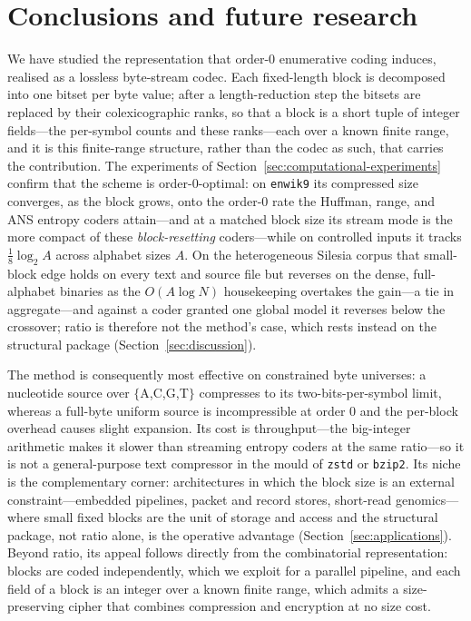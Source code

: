 \documentclass[entropy,article,submit,oneauthor,pdftex]{Definitions/mdpi}
\begin{document}
\section{Conclusions and future research}\label{sec:conclusions}
We have studied the representation that order-$0$ enumerative coding induces, realised as a
lossless byte-stream codec. Each fixed-length block is decomposed into one bitset per byte
value; after a length-reduction step the bitsets are replaced by their colexicographic
ranks, so that a block is a short tuple of integer fields---the per-symbol counts and these
ranks---each over a known finite range, and it is this finite-range structure, rather than
the codec as such, that carries the contribution. The experiments of
Section~\ref{sec:computational-experiments} confirm that the scheme is
order-$0$-optimal: on \texttt{enwik9} its compressed size converges, as the
block grows, onto the order-$0$ rate the Huffman, range, and ANS
entropy coders attain---and at a matched block size its stream mode is the more compact of
these \emph{block-resetting} coders---while on controlled inputs it tracks
$\tfrac18\log_2 A$ across alphabet sizes $A$. On the heterogeneous Silesia corpus that
small-block edge holds on every text and source file but reverses on the dense,
full-alphabet binaries as the $O(A\log N)$ housekeeping overtakes the gain---a tie in
aggregate---and against a coder granted one global model it reverses below the crossover;
ratio is therefore not the method's case, which rests instead on the structural package
(Section~\ref{sec:discussion}).

The method is consequently most effective on constrained byte universes: a
nucleotide source over $\{$A,C,G,T$\}$ compresses to its two-bits-per-symbol
limit, whereas a full-byte uniform source is incompressible at order $0$ and the
per-block overhead causes slight expansion. Its cost is throughput---the big-integer arithmetic makes it slower than
streaming entropy coders at the same ratio---so it is not a general-purpose
text compressor in the mould of \texttt{zstd} or \texttt{bzip2}. Its niche is
the complementary corner: architectures in which the block size is an external
constraint---embedded pipelines, packet and record stores, short-read
genomics---where small fixed blocks are the unit of storage and access and the
structural package, not ratio alone, is the operative advantage
(Section~\ref{sec:applications}). Beyond ratio, its
appeal follows directly from the combinatorial representation: blocks are
coded independently, which we exploit for a parallel pipeline, and each field of a
block is an integer over a known finite range, which admits a size-preserving cipher
that combines compression and encryption at no size cost.
\end{document}
